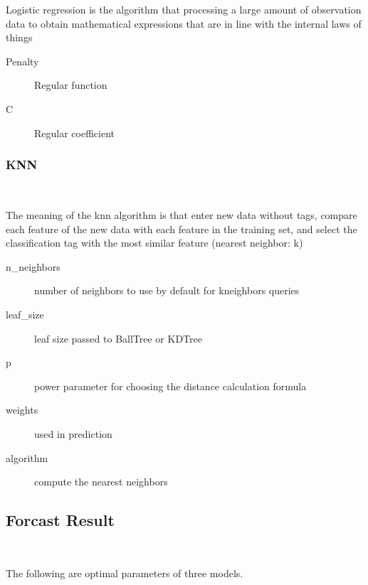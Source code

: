 Logistic regression is the algorithm that 
processing a large amount of 
observation data to 
obtain mathematical expressions 
that are in line with 
the internal laws of things


\begin{description}
	\item[Penalty] Regular function
	\item[C] Regular coefficient
\end{description}




\subsubsection{KNN}
\

The meaning of the knn algorithm is that 
enter new data without tags, 
compare each feature of the new data with 
each feature in the training set, 
and select the classification tag with 
the most similar feature (nearest neighbor: k)


\begin{description}
	\item[n_neighbors] number of neighbors to use 
	by default for kneighbors queries
	\item[leaf_size] leaf size passed to BallTree or KDTree
	\item[p] power parameter for choosing 
	the distance calculation formula
	\item[weights] used in prediction
	\item[algorithm] compute the nearest neighbors
\end{description}

	
\subsection{Forcast Result}

\

The following are optimal parameters of three models. 

